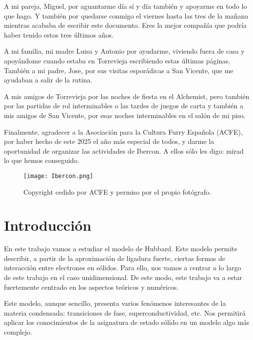 \documentclass[12pt,twoside]{article}
\begin{document}
A mi pareja, Miguel, por aguantarme día sí y día también y apoyarme en todo lo que hago. Y también por quedarse conmigo el viernes hasta las tres de la mañana mientras acababa de escribir este documento. Eres la mejor compañía que podría haber tenido estos tres últimos años.

A mi familia, mi madre Luisa y Antonio por ayudarme, viviendo fuera de casa y apoyándome cuando estaba en Torrevieja escribiendo estas últimas páginas. También a mi padre, Jose, por sus visitas esporádicas a San Vicente, que me ayudaban a salir de la rutina.

A mis amigos de Torrevieja por las noches de fiesta en el Alchemist, pero también por las partidas de rol interminables o las tardes de juegos de carta y también a mis amigos de San Vicente, por esas noches interminables en el salón de mi piso.

Finalmente, agradecer a la Asociación para la Cultura Furry Española (ACFE), por haber hecho de este 2025 el año más especial de todos, y darme la oportunidad de organizar las actividades de Ibercon. A ellos sólo les digo: mirad lo que hemos conseguido.
\begin{figure}[h!]
  \begin{center}
    \texttt{[image: Ibercon.png]}
    \caption{Copyright cedido por ACFE y permiso por el propio fotógrafo.}
  \end{center}
\end{figure}

\newpage

\tableofcontents

\newpage

\section{Introducción}

En este trabajo vamos a estudiar el modelo de Hubbard. Este modelo permite describir, a partir de la aproximación de ligadura fuerte, ciertas formas de interacción entre electrones en sólidos. Para ello, nos vamos a centrar a lo largo de este trabajo en el caso unidimensional. De este modo, este trabajo va a estar fuertemente centrado en los aspectos teóricos y numéricos.

Este modelo, aunque sencillo, presenta varios fenómenos interesantes de la materia condensada: transiciones de fase, superconductividad, etc. Nos permitirá aplicar los conocimientos de la asignatura de estado sólido en un modelo algo más complejo.
\end{document}
